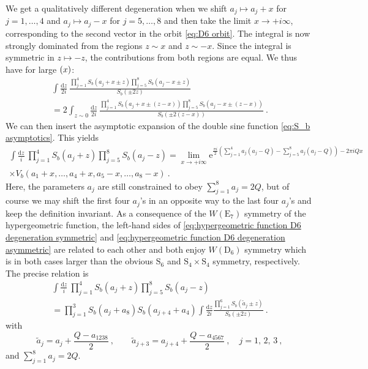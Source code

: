\documentclass[12pt,a4paper]{article}
\newcommand{\be}{\begin{equation}}
\newcommand{\ee}{\end{equation}}
\renewcommand\d{\text{d}}
\let\Im\relax
\DeclareMathOperator\Im{Im}
\begin{document}
We get a qualitatively different degeneration when we shift $a_j \mapsto a_j+x$ for $j=1,\dots,4$ and $a_j \mapsto a_j-x$ for $j=5,\dots,8$ and then take the limit $x \to +i \infty$, corresponding to the second vector in the orbit \eqref{eq:D6 orbit}. The integral is now strongly dominated from the regions $z \sim x$ and $z \sim -x$. Since the integral is symmetric in $z \mapsto -z$, the contributions from both regions are equal. We thus have for large $\Im(x)$:
\begin{multline}
    \int \frac{\d z}{2i}\ \frac{\prod_{j=1}^4 S_b(a_j +x \pm z) \prod_{j=5}^8 S_b(a_j-x \pm z)}{S_b(\pm 2z)}\\
    =
    2\int_{z \sim 0} \frac{\d z}{2i}\ \frac{\prod_{j=1}^4 S_b(a_j +x \pm (z-x)) \prod_{j=5}^8 S_b(a_j-x \pm (z-x))}{S_b(\pm 2(z-x))}\ .
\end{multline}
We can then insert the asymptotic expansion of the double sine function \eqref{eq:S_b asymptotics}. This yields
\begin{multline}
    \int \frac{\d z}{i}\  \prod_{j=1}^4 S_b(a_j+z) \prod_{j=5}^8 S_b(a_j-z)=\lim_{x \to +i \infty} \mathrm{e}^{\frac{\pi i}{2}(\sum_{j=1}^4 a_j(a_j-Q)-\sum_{j=5}^8 a_j(a_j-Q))-2\pi i Q x} \\
    \times V_b(a_1+x,\dots,a_4+x,a_5-x,\dots,a_8-x)\ .\label{eq:hypergeometric function D6 degeneration asymmetric}
\end{multline}
Here, the parameters $a_j$ are still constrained to obey $\sum_{j=1}^8 a_j=2Q$, but of course we may shift the first four $a_j$'s in an opposite way to the last four $a_j$'s and keep the definition invariant.
As a consequence of the $W(\text{E}_7)$ symmetry of the hypergeometric function, the left-hand sides of \eqref{eq:hypergeometric function D6 degeneration symmetric} and \eqref{eq:hypergeometric function D6 degeneration asymmetric} are related to each other and both enjoy $W(\mathrm{D}_6)$ symmetry which is in both cases larger than the obvious $\mathrm{S}_6$ and $\mathrm{S}_4 \times \mathrm{S}_4$ symmetry, respectively. The precise relation is
    \begin{multline} 
        \int \frac{\d z}{i}\  \prod_{j=1}^4 S_b(a_j+z) \prod_{j=5}^8 S_b(a_j-z)\\
        =\prod_{j=1}^3 S_b(a_j+a_8) S_b(a_{j+4}+a_4) \int \frac{\d z}{2i} \frac{\prod_{j=1}^6 S_b(\tilde{a}_j \pm z)}{S_b(\pm 2z)}\ . \label{eq:alternative representation Gb}
    \end{multline}
    with
    \be 
        \tilde{a}_j=a_j+\frac{Q-a_{1238}}{2}\ , \qquad \tilde{a}_{j+3}=a_{j+4}+\frac{Q-a_{4567}}{2}\ , \quad j=1,\,2,\, 3\ ,
    \ee
    and $\sum_{j=1}^8 a_j=2Q$.
\end{document}
